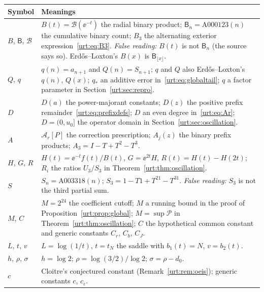 \documentclass[11pt,letterpaper]{article}
\theoremstyle{remark}\newtheorem{remark}[theorem]{Remark}
\newcommand{\Beta}{\mathsf B}
\newcommand{\Pc}{\mathcal P}\newcommand{\Bc}{\mathcal B}\newcommand{\dd}{\mathrm d}
\begin{document}
\noindent\begin{tabular}{@{}>{\raggedright\arraybackslash}p{0.8in}>{\raggedright\arraybackslash}p{5.4in}@{}}
\toprule
Symbol & Meanings\\
\midrule
$B$, $\Beta$, $\Bc$ & $B(t)=\Bc(\ee^{-t})$ the radial binary product; $\Beta_n=\mathrm{A000123}(n)$ the cumulative binary count; $B_3$ the alternating exterior expression~\eqref{urt:eq:B3}. \emph{False reading:} $B(t)$ is not $\Beta_n$ (the source says so). Erd\H{o}s--Loxton's $B(x)$ is $\Beta_{\lfloor x\rfloor}$.\\
$Q$, $q$ & $q(n)=a_{n+1}$ and $Q(n)=S_{n+1}$; $q$ and $Q$ also Erd\H{o}s--Loxton's $q(n)$, $Q(x)$; $q_*$ an additive error in~\eqref{urt:eq:globaltail}; $q$ a factor parameter in Section~\ref{urt:sec:repro}.\\
$D$ & $D(a)$ the power-majorant constants; $D(z)$ the positive prefix remainder~\eqref{urt:eq:prefixdefs}; $D$ an even degree in~\eqref{urt:eq:Ar}; $D=(0,u_0]$ the operator domain in Section~\ref{urt:sec:oscillation}.\\
$A$ & $\mathcal A_r[P]$ the correction prescription; $A_j(z)$ the binary prefix products; $A_3=I-T+T^2-T^3$.\\
$H$, $G$, $R$ & $H(t)=\ee^{-t}f(t)/B(t)$, $G=\ee^{2t}H$, $R(t)=H(t)-H(2t)$; $R_i$ the ratios $U_3/S_3$ in Theorem~\ref{urt:thm:oscillation}.\\
$S$ & $S_n=\mathrm{A003318}(n)$; $S_3=1-T1+T^21-T^31$. \emph{False reading:} $S_3$ is not the third partial sum.\\
$M$, $C$ & $M=2^{24}$ the coefficient cutoff; $M$ a running bound in the proof of Proposition~\ref{urt:prop:global}; $M=\sup\Pc$ in Theorem~\ref{urt:thm:oscillation}; $C$ the hypothetical common constant and generic constants $C_r$, $C_b$, $C_J$.\\
$L$, $t$, $v$ & $L=\log(1/t)$, $t=t_N$ the saddle with $b_1(t)=N$, $v=b_2(t)$.\\
$h$, $\rho$, $\sigma$ & $h=\log2$; $\rho=\log(3/2)/\log2$; $\sigma=\rho-d_0$. \\
$c$ & Cloitre's conjectured constant (Remark~\ref{urt:rem:oeis}); generic constants $c$, $c_\varepsilon$.\\
\bottomrule
\end{tabular}
\endgroup
\end{document}
